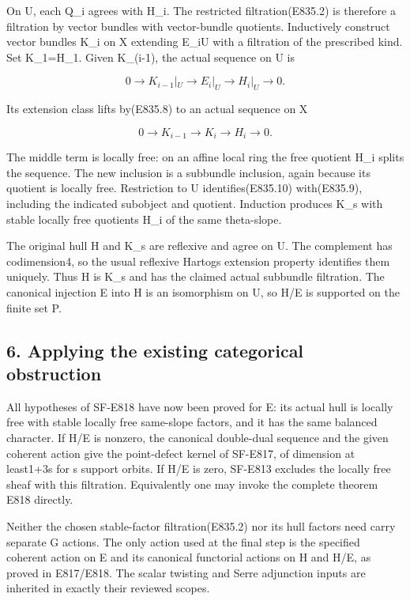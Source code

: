 On U, each Q\_i agrees with H\_i. The restricted filtration(E835.2) is
therefore a filtration by vector bundles with vector-bundle quotients.
Inductively construct vector bundles K\_i on X extending E\_i\textbar U
with a filtration of the prescribed kind. Set K\_1=H\_1. Given K\_(i-1),
the actual sequence on U is

\[
 0\longrightarrow K_{i-1}|_U\longrightarrow E_i|_U
             \longrightarrow H_i|_U\longrightarrow0.
 \tag{E835.9}
\]

Its extension class lifts by(E835.8) to an actual sequence on X

\[
 0\longrightarrow K_{i-1}\longrightarrow K_i
                    \longrightarrow H_i\longrightarrow0.
 \tag{E835.10}
\]

The middle term is locally free: on an affine local ring the free
quotient H\_i splits the sequence. The new inclusion is a subbundle
inclusion, again because its quotient is locally free. Restriction to U
identifies(E835.10) with(E835.9), including the indicated subobject and
quotient. Induction produces K\_s with stable locally free quotients
H\_i of the same theta-slope.

The original hull H and K\_s are reflexive and agree on U. The
complement has codimension4, so the usual reflexive Hartogs extension
property identifies them uniquely. Thus H is K\_s and has the claimed
actual subbundle filtration. The canonical injection E into H is an
isomorphism on U, so H/E is supported on the finite set P.

\subsection{6. Applying the existing categorical
obstruction}\label{SF-E835:applying-the-existing-categorical-obstruction}

All hypotheses of SF-E818 have now been proved for E: its actual hull is
locally free with stable locally free same-slope factors, and it has the
same balanced character. If H/E is nonzero, the canonical double-dual
sequence and the given coherent action give the point-defect kernel of
SF-E817, of dimension at least1+3s for s support orbits. If H/E is zero,
SF-E813 excludes the locally free sheaf with this filtration.
Equivalently one may invoke the complete theorem E818 directly.

Neither the chosen stable-factor filtration(E835.2) nor its hull factors
need carry separate G actions. The only action used at the final step is
the specified coherent action on E and its canonical functorial actions
on H and H/E, as proved in E817/E818. The scalar twisting and Serre
adjunction inputs are inherited in exactly their reviewed scopes.

